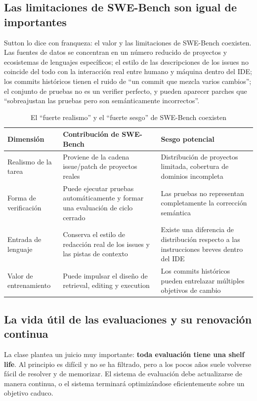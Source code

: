 \documentclass[a4paper]{article}
\begin{document}
\subsection{Las limitaciones de SWE-Bench son igual de importantes}
Sutton lo dice con franqueza: el valor y las limitaciones de SWE-Bench coexisten. Las fuentes de datos se concentran en un número reducido de proyectos y ecosistemas de lenguajes específicos; el estilo de las descripciones de los issues no coincide del todo con la interacción real entre humano y máquina dentro del IDE; los commits históricos tienen el ruido de ``un commit que mezcla varios cambios''; el conjunto de pruebas no es un verifier perfecto, y pueden aparecer parches que ``sobreajustan las pruebas pero son semánticamente incorrectos''.

\begin{table}[H]
\centering
\begin{tabular}{p{3.4cm}p{5.0cm}p{5.0cm}}
\toprule
\textbf{Dimensión} & \textbf{Contribución de SWE-Bench} & \textbf{Sesgo potencial} \\
\midrule
Realismo de la tarea & Proviene de la cadena issue/patch de proyectos reales & Distribución de proyectos limitada, cobertura de dominios incompleta \\
Forma de verificación & Puede ejecutar pruebas automáticamente y formar una evaluación de ciclo cerrado & Las pruebas no representan completamente la corrección semántica \\
Entrada de lenguaje & Conserva el estilo de redacción real de los issues y las pistas de contexto & Existe una diferencia de distribución respecto a las instrucciones breves dentro del IDE \\
Valor de entrenamiento & Puede impulsar el diseño de retrieval, editing y execution & Los commits históricos pueden entrelazar múltiples objetivos de cambio \\
\bottomrule
\end{tabular}
\caption{El ``fuerte realismo'' y el ``fuerte sesgo'' de SWE-Bench coexisten}
\end{table}

\subsection{La vida útil de las evaluaciones y su renovación continua}
La clase plantea un juicio muy importante: \textbf{toda evaluación tiene una shelf life}. Al principio es difícil y no se ha filtrado, pero a los pocos años suele volverse fácil de resolver y de memorizar. El sistema de evaluación debe actualizarse de manera continua, o el sistema terminará optimizándose eficientemente sobre un objetivo caduco.
\end{document}
